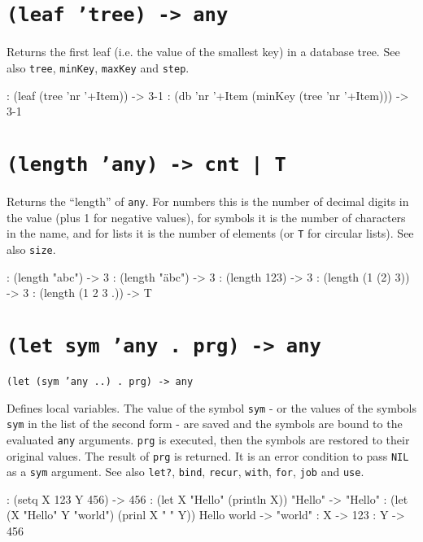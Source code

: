  
\section*{\texttt{(leaf 'tree) -> any}}
\label{sec:func-ref-L-(leaf 'tree) -> any}


Returns the first leaf (i.e. the value of the smallest key) in a
database tree. See also \texttt{tree}, \texttt{minKey}, \texttt{maxKey} and \texttt{step}.


\begin{wideverbatim}
: (leaf (tree 'nr '+Item))
-> {3-1}
: (db 'nr '+Item (minKey (tree 'nr '+Item)))
-> {3-1}
\end{wideverbatim}

 
\section*{\texttt{(length 'any) -> cnt | T}}
\label{sec:func-ref-L-(length 'any) -> cnt | T}


Returns the ``length'' of \texttt{any}. For numbers this is the number of decimal
digits in the value (plus 1 for negative values), for symbols it is the
number of characters in the name, and for lists it is the number of
elements (or \texttt{T} for circular lists). See also \texttt{size}.


\begin{wideverbatim}
: (length "abc")
-> 3
: (length "äbc")
-> 3
: (length 123)
-> 3
: (length (1 (2) 3))
-> 3
: (length (1 2 3 .))
-> T
\end{wideverbatim}

 
\section*{\texttt{(let sym 'any . prg) -> any}}
\label{sec:func-ref-L-(let sym 'any . prg) -> any}


\texttt{(let (sym 'any ..) . prg) -> any}

Defines local variables. The value of the symbol \texttt{sym} - or the values
of the symbols \texttt{sym} in the list of the second form - are saved and the
symbols are bound to the evaluated \texttt{any} arguments. \texttt{prg} is executed,
then the symbols are restored to their original values. The result of
\texttt{prg} is returned. It is an error condition to pass \texttt{NIL} as a \texttt{sym}
argument. See also \texttt{let?}, \texttt{bind}, \texttt{recur}, \texttt{with}, \texttt{for}, \texttt{job} and
\texttt{use}.


\begin{wideverbatim}
: (setq  X 123  Y 456)
-> 456
: (let X "Hello" (println X))
"Hello"
-> "Hello"
: (let (X "Hello" Y "world") (prinl X " " Y))
Hello world
-> "world"
: X
-> 123
: Y
-> 456
\end{wideverbatim}

